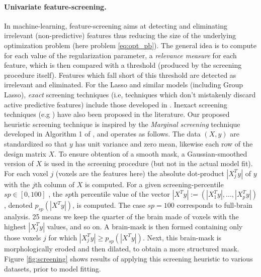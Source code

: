 \paragraph{Univariate feature-screening.}
In machine-learning, feature-screening aims at detecting and
eliminating irrelevant (non-predictive)
features thus reducing the size of the underlying
optimization problem (here problem \eqref{eq:opt_pb}). The general idea
is to compute for each value of the regularization parameter, a
\textit{relevance measure} for each feature, which is then compared with a
threshold (produced by the screening procedure itself). Features which fall short
of this threshold are detected as irrelevant and eliminated. For the
Lasso and similar models (including Group Lasso),
\textit{exact}
screening techniques (i.e, techniques
  which don't mistakenly discard active predictive features) include those developed in
\citep{elghaoui2010,lee2014exact,liu2014safe,wang2015lasso}. Inexact
screening techniques (e.g \citep{tibshirani2010strong}) have also been
proposed in the literature.
Our proposed heuristic screening technique is inspired by the
\textit{Marginal screening} technique developed in Algorithm 1 of
\citep{lee2014exact}, and operates as
follows. The data $(X,y)$ are standardized so that $y$ has unit
variance and zero mean, likewise each row of the design matrix $X$. To
ensure obtention of a smooth mask, a Gaussian-smoothed version
of $X$ is used in the screening procedure (but not in the actual model
fit).
For each voxel $j$ (voxels are the features here) the
absolute dot-product $|X^T_jy|$ of $y$ with the $j$th column of
$X$ is computed.
For a given screening-percentile
$sp \in [0, 100]$ , the $sp$th percentile value of the
vector $|X^Ty| := (|X^T_1y|, ..., |X^T_py|)$, denoted $p_{sp}(|X^Ty|)$,
is computed. The case $sp=100$ corresponds to full-brain analysis. 25
means we keep the quarter of the brain made of voxels with the highest
$|X^T_jy|$ values, and so on.
A brain-mask is then formed containing only those voxels $j$
for which $|X^T_jy| \ge p_{sp}(|X^Ty|)$. Next, this brain-mask is
morphologically eroded
and then
dilated, to obtain a more structured mask.  Figure
\ref{fig:screening} shows results of applying this screening heuristic
to various datasets, prior to model fitting.

